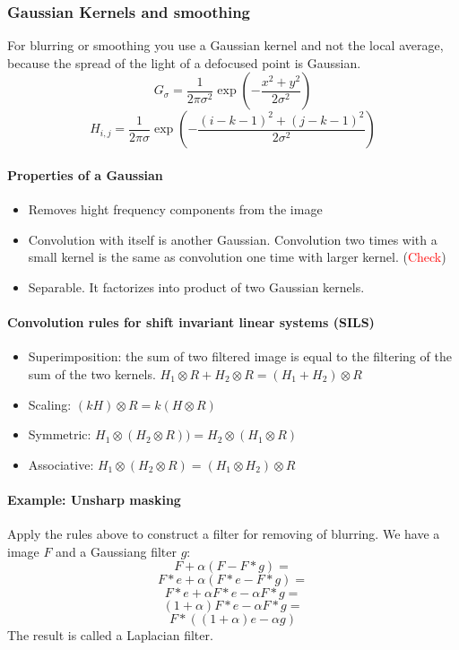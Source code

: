 \documentclass[10pt,a4paper]{article}
\begin{document}
\subsubsection{Gaussian Kernels and smoothing}
For blurring or smoothing you use a Gaussian kernel and not the local average, because the spread of the light of a defocused point is Gaussian.
\[ G_{\sigma} = \frac{1}{2 \pi \sigma^2} \exp(-\frac{x^2 + y^2}{2\sigma^2}) \]
\[ H_{i,j} = \frac{1}{2\pi\sigma}\exp(-\frac{(i-k-1)^2 + (j-k-1)^2}{2\sigma^2})\]

\paragraph{Properties of a Gaussian}
\begin{itemize}
\item Removes hight frequency components from the image
\item Convolution with itself is another Gaussian. Convolution two times with a small kernel is the same as convolution one time with larger kernel. (\textcolor{red}{Check})
\item Separable. It factorizes into product of two Gaussian kernels.
\end{itemize}

\paragraph{Convolution rules for shift invariant linear systems (SILS)}
\begin{itemize}
\item Superimposition: the sum of two filtered image is equal to the filtering of the sum of the two kernels. 
$H_1 \otimes R + H_2 \otimes R = (H_1 + H_2) \otimes R$
\item Scaling: $(kH) \otimes R = k(H \otimes R)$
\item Symmetric: $ H_1 \otimes (H_2 \otimes R)) = H_2 \otimes (H_1 \otimes R)$
\item Associative: $ H_1 \otimes (H_2 \otimes R) = (H_1 \otimes H_2) \otimes R$
\end{itemize}

\paragraph{Example: Unsharp masking}
Apply the rules above to construct a filter for removing of blurring. 
We have a image $F$ and a Gaussiang filter $g$:
\[ F + \alpha(F - F * g) = \]
\[ F*e + \alpha(F*e - F*g) = \]
\[ F*e + \alpha F*e - \alpha F*g =\]
\[ (1 + \alpha)F*e - \alpha F*g = \]
\[ F*((1 + \alpha)e - \alpha g)\]
The result is called a Laplacian filter.
\end{document}
